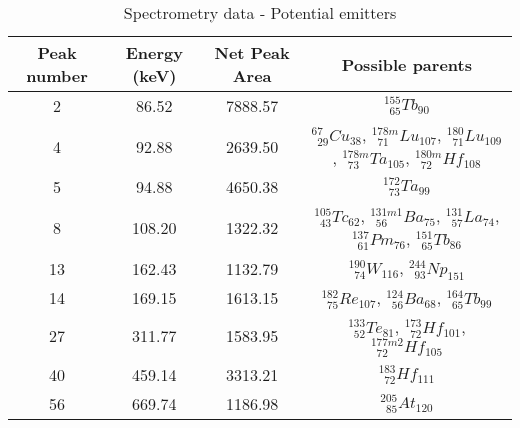 \renewcommand{\arraystretch}{2}
\begin{table}[!htb]
    \centering
        \begin{tabular}{cccc}
        \hline
        Peak number & Energy (keV) & Net Peak Area & Possible parents \\ \hline\hline
		2           & 86.52        & 7888.57       & $^{155}_{\phantom{0}65}Tb_{90}$ \\
		4           & 92.88        & 2639.50       & $^{67}_{\phantom{0}29}Cu_{38}$, $^{178m}_{\phantom{0}71}Lu_{107}$, $^{180}_{\phantom{0}71}Lu_{109}$, $^{178m}_{\phantom{0}73}Ta_{105}$, $^{180m}_{\phantom{0}72}Hf_{108}$ \\
		5           & 94.88        & 4650.38       & $^{172}_{\phantom{0}73}Ta_{99}$ \\
		8           & 108.20       & 1322.32       & $^{105}_{\phantom{0}43}Tc_{62}$, $^{131m1}_{\phantom{0}56}Ba_{75}$, $^{131}_{\phantom{0}57}La_{74}$, $^{137}_{\phantom{0}61}Pm_{76}$, $^{151}_{\phantom{0}65}Tb_{86}$ \\
		13          & 162.43       & 1132.79       & $^{190}_{\phantom{0}74}W_{116}$, $^{244}_{\phantom{0}93}Np_{151}$ \\
		14          & 169.15       & 1613.15       & $^{182}_{\phantom{0}75}Re_{107}$, $^{124}_{\phantom{0}56}Ba_{68}$, $^{164}_{\phantom{0}65}Tb_{99}$ \\
		27          & 311.77       & 1583.95       & $^{133}_{\phantom{0}52}Te_{81}$, $^{173}_{\phantom{0}72}Hf_{101}$, $^{177m2}_{\phantom{0}72}Hf_{105}$\\
		40          & 459.14       & 3313.21       & $^{183}_{\phantom{0}72}Hf_{111}$\\
		56          & 669.74       & 1186.98       & $^{205}_{\phantom{0}85}At_{120}$
        \end{tabular}
        \caption{Spectrometry data - Potential emitters}\label{tab:specdata_p}
\end{table}

